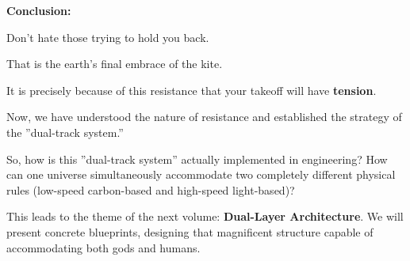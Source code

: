 \textbf{Conclusion:}

Don't hate those trying to hold you back.

That is the earth's final embrace of the kite.

It is precisely because of this resistance that your takeoff will have \textbf{tension}.

Now, we have understood the nature of resistance and established the strategy of the ''dual-track system.''

So, how is this ''dual-track system'' actually implemented in engineering? How can one universe simultaneously accommodate two completely different physical rules (low-speed carbon-based and high-speed light-based)?

This leads to the theme of the next volume: \textbf{Dual-Layer Architecture}. We will present concrete blueprints, designing that magnificent structure capable of accommodating both gods and humans.

